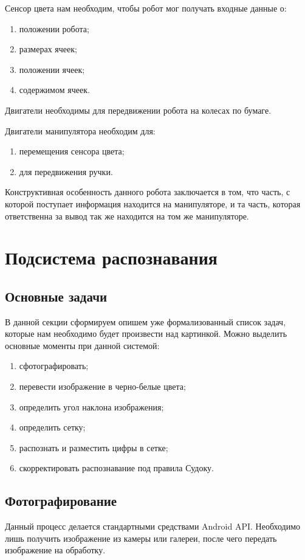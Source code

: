 Сенсор цвета нам необходим, чтобы робот мог получать входные данные о:
\begin{enumerate}
  \item положении робота;
  \item размерах ячеек;
  \item положении ячеек;
  \item содержимом ячеек.
\end{enumerate}

Двигатели необходимы для передвижении робота на колесах по бумаге.

Двигатели манипулятора необходим для:
\begin{enumerate}
  \item перемещения сенсора цвета;
  \item для передвижения ручки.
\end{enumerate}

Конструктивная особенность данного робота заключается в том, что часть, с которой поступает информация находится на манипуляторе, и та часть, которая ответственна за вывод так же находится на том же манипуляторе.


\section{Подсистема распознавания}
\subsection{Основные задачи}
В данной секции сформируем опишем уже формализованный список задач, которые нам необходимо будет произвести над картинкой.
Можно выделить основные моменты при данной системой:
\begin{enumerate}
  \item сфотографировать;
  \item перевести изображение в черно-белые цвета;
  \item определить угол наклона изображения;
  \item определить сетку;
  \item распознать и разместить цифры в сетке;
  \item скорректировать распознавание под правила Судоку.
\end{enumerate}

\subsection{Фотографирование}
Данный процесс делается стандартными средствами Android API. Необходимо лишь получить изображение из камеры или галереи, после чего передать изображение на обработку.

